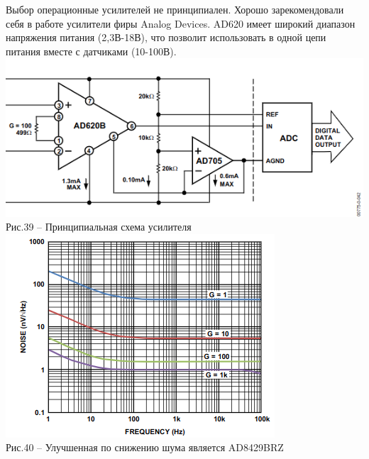 \documentclass[11pt]{report}
\begin{document}
Выбор операционные усилителей не принципиален. Хорошо зарекомендовали себя в работе усилители фиры Analog Devices. AD620 имеет широкий диапазон напряжения питания (2,3В-18В), что позволит использовать в одной цепи питания вместе с датчиками (10-100В). \\


\includegraphics[scale=0.6]{ad_620}\\
Рис.39 -- Принципиальная схема усилителя\\

\includegraphics[scale=0.8]{ad_8249}\\
Рис.40 -- Улучшенная по снижению шума является AD8429BRZ
\end{document}
